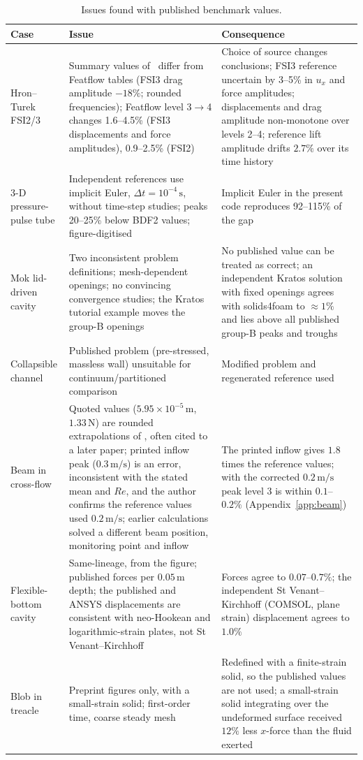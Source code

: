 \begin{table}[htbp]
	\centering
	\footnotesize
	\setlength{\tabcolsep}{3pt}
	\caption{Issues found with published benchmark values.}
	\label{tab:published}
	\begin{tabular}{p{2.8cm}p{5.8cm}p{5.0cm}}
		\toprule
		Case & Issue & Consequence \\
		\midrule
		Hron--Turek FSI2/3 & Summary values of~\citet{Turek2006} differ from Featflow tables (FSI3 drag amplitude $-18\%$; rounded frequencies); Featflow level 3$\to$4 changes 1.6--4.5\% (FSI3 displacements and force amplitudes), 0.9--2.5\% (FSI2) & Choice of source changes conclusions; FSI3 reference uncertain by 3--5\% in $u_x$ and force amplitudes; displacements and drag amplitude non-monotone over levels 2--4; reference lift amplitude drifts $2.7\%$ over its time history \\
		3-D pressure-pulse tube & Independent references use implicit Euler, $\Delta t = 10^{-4}\,\mathrm{s}$, without time-step studies; peaks 20--25\% below BDF2 values; figure-digitised & Implicit Euler in the present code reproduces 92--115\% of the gap \\
		Mok lid-driven cavity & Two inconsistent problem definitions; mesh-dependent openings; no convincing convergence studies; the Kratos tutorial example moves the group-B openings & No published value can be treated as correct; an independent Kratos solution with fixed openings agrees with solids4foam to $\approx1\%$ and lies above all published group-B peaks and troughs \\
		Collapsible channel & Published problem (pre-stressed, massless wall) unsuitable for continuum/partitioned comparison & Modified problem and regenerated reference used \\
		Beam in cross-flow & Quoted values ($5.95\times10^{-5}\,\mathrm{m}$, $1.33\,\mathrm{N}$) are rounded extrapolations of \citet{Richter2012}, often cited to a later paper; printed inflow peak ($0.3\,\mathrm{m/s}$) is an error, inconsistent with the stated mean and $Re$, and the author confirms the reference values used $0.2\,\mathrm{m/s}$; earlier calculations solved a different beam position, monitoring point and inflow & The printed inflow gives $1.8$ times the reference values; with the corrected $0.2\,\mathrm{m/s}$ peak level 3 is within $0.1$--$0.2\%$ (Appendix~\ref{app:beam}) \\
		Flexible-bottom cavity & Same-lineage, from the figure; published forces per $0.05\,\mathrm{m}$ depth; the published and ANSYS displacements are consistent with neo-Hookean and logarithmic-strain plates, not St Venant--Kirchhoff & Forces agree to $0.07$--$0.7\%$; the independent St Venant--Kirchhoff (COMSOL, plane strain) displacement agrees to $1.0\%$ \\
		Blob in treacle & Preprint figures only, with a small-strain solid; first-order time, coarse steady mesh & Redefined with a finite-strain solid, so the published values are not used; a small-strain solid integrating over the undeformed surface received $12\%$ less $x$-force than the fluid exerted \\
		\bottomrule
	\end{tabular}
\end{table}

